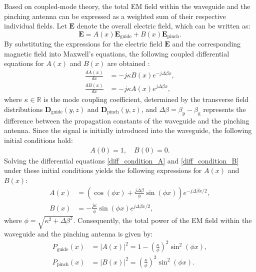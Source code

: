 Based on coupled-mode theory, the total EM field within the waveguide and the pinching antenna can be expressed as a weighted sum of their respective individual fields. Let $\mathbf{E}$ denote the overall electric field, which can be written as:
\begin{equation}
    \mathbf{E} = A(x) \mathbf{E}_{\mathrm{guide}} + B(x) \mathbf{E}_{\mathrm{pinch}}.
\end{equation}
By substituting the expressions for the electric field $\mathbf{E}$ and the corresponding magnetic field into Maxwell's equations, the following coupled differential equations for $A(x)$ and $B(x)$ are obtained \cite{okamoto2010fundamentals}:
\begin{align} \label{diff_condition_A}
    \frac{d A(x)}{d x} &= -j \kappa B(x) e^{-j \Delta \beta x}, \\
    \label{diff_condition_B}
    \frac{d B(x)}{d x} &= -j \kappa A(x) e^{j \Delta \beta x},
\end{align}
where $\kappa \in \mathbb{R}$ is the mode coupling coefficient, determined by the transverse field distributions $\mathbf{D}_{\mathrm{guide}}(y,z)$ and $\mathbf{D}_{\mathrm{pinch}}(y,z)$, and $\Delta \beta = \beta_{\mathrm{p}} - \beta_{\mathrm{g}}$ represents the difference between the propagation constants of the waveguide and the pinching antenna. Since the signal is initially introduced into the waveguide, the following initial conditions hold:
\begin{align}
    A(0) = 1, \quad B(0) = 0.
\end{align}
Solving the differential equations \eqref{diff_condition_A} and \eqref{diff_condition_B} under these initial conditions yields the following expressions for $A(x)$ and $B(x)$:
\begin{align}
    A(x) &= \left( \cos \left(\phi x \right) + \frac{j \Delta \beta}{\phi} \sin(\phi x) \right) e^{-j \Delta \beta x/2}, \\
    B(x) &= - \frac{j \kappa}{\phi} \sin(\phi x) e^{j \Delta \beta x/2},
\end{align}
where $\phi = \sqrt{\kappa^2 + \Delta \beta^2}$. Consequently, the total power of the EM field within the waveguide and the pinching antenna is given by:
\begin{align}
    P_{\mathrm{guide}}(x) &= \left| A(x) \right|^2 = 1 - \left( \frac{\kappa}{\phi} \right)^2 \sin^2(\phi x), \\
    P_{\mathrm{pinch}}(x) &= \left| B(x) \right|^2 = \left( \frac{\kappa}{\phi} \right)^2 \sin^2(\phi x).
\end{align}
